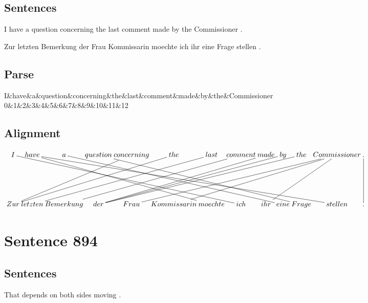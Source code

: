 \documentclass{report}
\begin{document}
\subsection*{Sentences}
I have a question concerning the last comment made by the Commissioner .

\noindent Zur letzten Bemerkung der Frau Kommissarin moechte ich ihr eine Frage stellen .



\subsection*{Parse}
\begin{dependency}[theme=simple]
\begin{deptext}[column sep=.5cm, row sep=.1ex]
I\&have\&a\&question\&concerning\&the\&last\&comment\&made\&by\&the\&Commissioner\\
0\&1\&2\&3\&4\&5\&6\&7\&8\&9\&10\&11\&12\\
\end{deptext}
\end{dependency}


\subsection*{Alignment}
\scriptsize{
$
\xymatrix@C-2.3pc{
I \ar @{-} [ddrrrrrrr] & have \ar @{-} [ddrrrrr] \ar @{-} [ddrrrrrrrrrr] & a \ar @{-} [ddrrrrrrr] & question \ar @{-} [ddrrrrrrr] & concerning \ar @{-} [ddllll] & the \ar @{-} [ddlllll] & last \ar @{-} [ddlllll] & comment \ar @{-} [ddlllll] & made \ar @{-} [ddlllll] & by \ar @{-} [ddllllll] & the \ar @{-} [ddlllllll] & Commissioner \ar @{-} [ddlllllll] \ar @{-} [ddllllll] \ar @{-} [ddlll] & . \ar @{-} [dd]\\\\
Zur & letzten & Bemerkung & der & Frau & Kommissarin & moechte & ich & ihr & eine & Frage & stellen & .
}$}
\newpage\section*{Sentence 894}

\subsection*{Sentences}
That depends on both sides moving .
\end{document}
